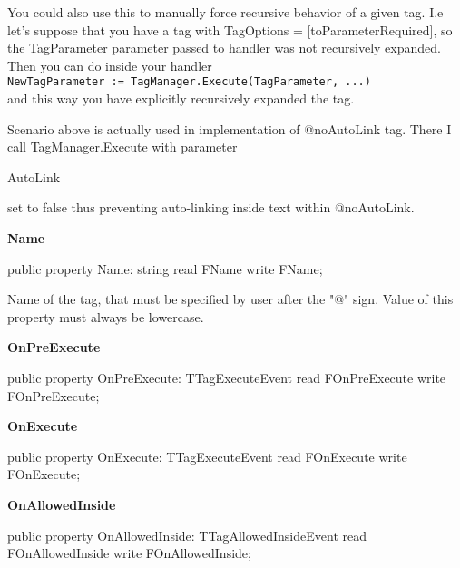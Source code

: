 \documentclass{report}
\newif\ifpdf
\begin{document}
\begin{list}{}
You could also use this to manually force recursive behavior of a given tag. I.e let's suppose that you have a tag with TagOptions = [toParameterRequired], so the TagParameter parameter passed to handler was not recursively expanded. Then you can do inside your handler \texttt{NewTagParameter~:=~TagManager.Execute(TagParameter,~...)\\
} and this way you have explicitly recursively expanded the tag.

Scenario above is actually used in implementation of @noAutoLink tag. There I call TagManager.Execute with parameter \begin{ttfamily}AutoLink\end{ttfamily} set to false thus preventing auto{-}linking inside text within @noAutoLink.\label{PasDoc_TagManager.TTag-Name}
\item[\textbf{Name}\hfill]
\ifpdf
\begin{flushleft}
\fi
\begin{ttfamily}
public property Name: string read FName write FName;\end{ttfamily}

\ifpdf
\end{flushleft}
\fi


\par Name of the tag, that must be specified by user after the "@" sign. Value of this property must always be lowercase.\label{PasDoc_TagManager.TTag-OnPreExecute}
\item[\textbf{OnPreExecute}\hfill]
\ifpdf
\begin{flushleft}
\fi
\begin{ttfamily}
public property OnPreExecute: TTagExecuteEvent
      read FOnPreExecute write FOnPreExecute;\end{ttfamily}

\ifpdf
\end{flushleft}
\fi


\par  \label{PasDoc_TagManager.TTag-OnExecute}
\item[\textbf{OnExecute}\hfill]
\ifpdf
\begin{flushleft}
\fi
\begin{ttfamily}
public property OnExecute: TTagExecuteEvent
      read FOnExecute write FOnExecute;\end{ttfamily}

\ifpdf
\end{flushleft}
\fi


\par  \label{PasDoc_TagManager.TTag-OnAllowedInside}
\item[\textbf{OnAllowedInside}\hfill]
\ifpdf
\begin{flushleft}
\fi
\begin{ttfamily}
public property OnAllowedInside: TTagAllowedInsideEvent
      read FOnAllowedInside write FOnAllowedInside;\end{ttfamily}

\ifpdf
\end{flushleft}
\fi


\par  \end{list}
\end{document}
